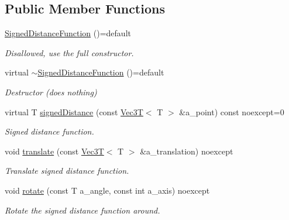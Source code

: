 \subsection*{Public Member Functions}
\begin{DoxyCompactItemize}
\item 
\mbox{\label{classSignedDistanceFunction_abfeeff9b3901e03ec6b73317dc9a722e}} 
\hyperlink{classSignedDistanceFunction_abfeeff9b3901e03ec6b73317dc9a722e}{Signed\+Distance\+Function} ()=default
\begin{DoxyCompactList}\small\item\em Disallowed, use the full constructor. \end{DoxyCompactList}\item 
\mbox{\label{classSignedDistanceFunction_ab47b289bd8351d7f323938c91b2bb92b}} 
virtual \hyperlink{classSignedDistanceFunction_ab47b289bd8351d7f323938c91b2bb92b}{$\sim$\+Signed\+Distance\+Function} ()=default
\begin{DoxyCompactList}\small\item\em Destructor (does nothing) \end{DoxyCompactList}\item 
virtual T \hyperlink{classSignedDistanceFunction_af5912280ca51dc21a2d6949a30ec7d21}{signed\+Distance} (const \hyperlink{classVec3T}{Vec3T}$<$ T $>$ \&a\+\_\+point) const noexcept=0
\begin{DoxyCompactList}\small\item\em Signed distance function. \end{DoxyCompactList}\item 
void \hyperlink{classSignedDistanceFunction_add71ebc2e7f3fb5e85766898413482e7}{translate} (const \hyperlink{classVec3T}{Vec3T}$<$ T $>$ \&a\+\_\+translation) noexcept
\begin{DoxyCompactList}\small\item\em Translate signed distance function. \end{DoxyCompactList}\item 
void \hyperlink{classSignedDistanceFunction_ae8de697f4d0966290342bcf6383585ef}{rotate} (const T a\+\_\+angle, const int a\+\_\+axis) noexcept
\begin{DoxyCompactList}\small\item\em Rotate the signed distance function around. \end{DoxyCompactList}\end{DoxyCompactItemize}
